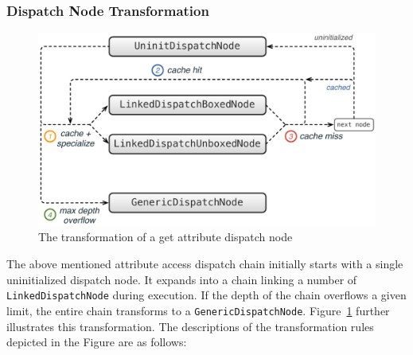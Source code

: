 \subsubsection{Dispatch Node Transformation}

\begin{figure}
\centering
\includegraphics[scale=.65]{figures/ch5-attribute-dispatch-transformation}
\caption{The transformation of a get attribute dispatch node}
\label{fig:ch5-attribute-dispatch-transformation}
\end{figure}

The above mentioned attribute access dispatch chain initially starts with a single uninitialized dispatch node.
It expands into a chain linking a number of \texttt{LinkedDispatchNode} during execution.
If the depth of the chain overflows a given limit, the entire chain transforms to a \texttt{GenericDispatchNode}.
Figure~\ref{fig:ch5-attribute-dispatch-transformation} further illustrates this transformation.
The descriptions of the transformation rules depicted in the Figure are as follows:

